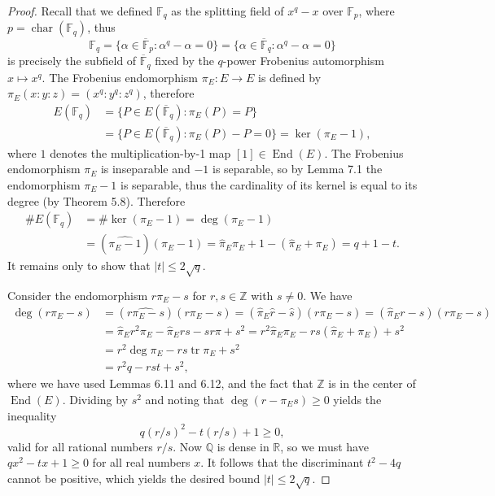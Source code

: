 \documentclass[UTF8,11pt]{ctexart}
\newcommand{\End}{\operatorname{End}}
\newcommand{\tr}{\operatorname{tr}}
\begin{document}
\begin{proof}
Recall that we defined $\mathbb F_q$ as the splitting field of $x^q-x$ over $\mathbb F_p$, where $p=\operatorname{char}(\mathbb F_q)$, thus
\[
\mathbb F_q=\{\alpha\in\overline{\mathbb F}_p:\alpha^q-\alpha=0\}
=\{\alpha\in\overline{\mathbb F}_q:\alpha^q-\alpha=0\}
\]
is precisely the subfield of $\overline{\mathbb F}_q$ fixed by the $q$-power Frobenius automorphism $x\mapsto x^q$. The Frobenius endomorphism $\pi_E:E\to E$ is defined by $\pi_E(x:y:z)=(x^q:y^q:z^q)$, therefore
\[
\begin{aligned}
E(\mathbb F_q)&=\{P\in E(\overline{\mathbb F}_q):\pi_E(P)=P\}\\
&=\{P\in E(\overline{\mathbb F}_q):\pi_E(P)-P=0\}=\ker(\pi_E-1),
\end{aligned}
\]
where $1$ denotes the multiplication-by-1 map $[1]\in\End(E)$. The Frobenius endomorphism $\pi_E$ is inseparable and $-1$ is separable, so by Lemma 7.1 the endomorphism $\pi_E-1$ is separable, thus the cardinality of its kernel is equal to its degree (by Theorem 5.8). Therefore
\[
\begin{aligned}
\#E(\mathbb F_q)&=\#\ker(\pi_E-1)=\deg(\pi_E-1)\\
&=(\widehat{\pi_E-1})(\pi_E-1)
=\widehat\pi_E\pi_E+1-(\widehat\pi_E+\pi_E)=q+1-t.
\end{aligned}
\]
It remains only to show that $|t|\le2\sqrt q$.

Consider the endomorphism $r\pi_E-s$ for $r,s\in\mathbb Z$ with $s\ne0$. We have
\[
\begin{aligned}
\deg(r\pi_E-s)&=(\widehat{r\pi_E-s})(r\pi_E-s)
=(\widehat\pi_E\widehat r-\widehat s)(r\pi_E-s)
=(\widehat\pi_Er-s)(r\pi_E-s)\\
&=\widehat\pi_Er^2\pi_E-\widehat\pi_Ers-sr\pi+s^2
=r^2\widehat\pi_E\pi_E-rs(\widehat\pi_E+\pi_E)+s^2\\
&=r^2\deg\pi_E-rs\tr\pi_E+s^2\\
&=r^2q-rst+s^2,
\end{aligned}
\]
where we have used Lemmas 6.11 and 6.12, and the fact that $\mathbb Z$ is in the center of $\End(E)$. Dividing by $s^2$ and noting that $\deg(r-\pi_Es)\ge0$ yields the inequality
\[
q(r/s)^2-t(r/s)+1\ge0,
\]
valid for all rational numbers $r/s$. Now $\mathbb Q$ is dense in $\mathbb R$, so we must have $qx^2-tx+1\ge0$ for all real numbers $x$. It follows that the discriminant $t^2-4q$ cannot be positive, which yields the desired bound $|t|\le2\sqrt q$.
\end{proof}
\end{document}
